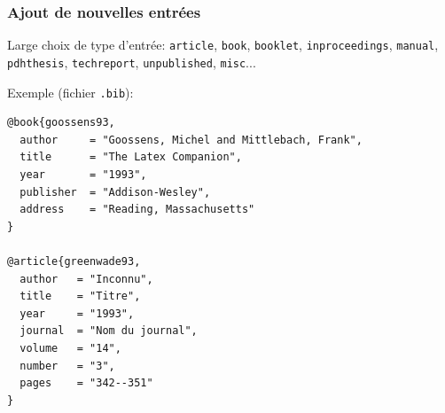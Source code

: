 \documentclass{beamer}
\begin{document}


\begin{frame}[fragile]
\frametitle{Ajout de nouvelles entrées}

Large choix de type d'entrée:
\texttt{article}, \texttt{book}, \texttt{booklet}, \texttt{inproceedings},
\texttt{manual}, \texttt{pdhthesis}, \texttt{techreport}, \texttt{unpublished}, \texttt{misc}...

Exemple (fichier \texttt{.bib}):
\begin{lstlisting}
@book{goossens93,
  author     = "Goossens, Michel and Mittlebach, Frank",
  title      = "The Latex Companion",
  year       = "1993",
  publisher  = "Addison-Wesley",
  address    = "Reading, Massachusetts"
}

@article{greenwade93,
  author   = "Inconnu",
  title    = "Titre",
  year     = "1993",
  journal  = "Nom du journal",
  volume   = "14",
  number   = "3",
  pages    = "342--351"
}
\end{lstlisting}
\end{frame}

\end{document}
